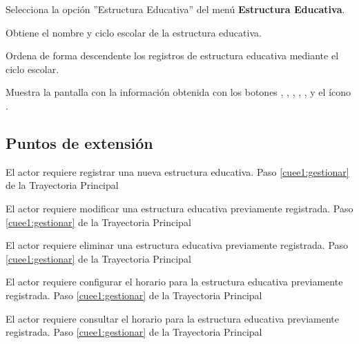 \begin{UCtrayectoria}
	
	\UCpaso [\UCactor] Selecciona la opción ''Estructura Educativa'' del menú \textbf{Estructura Educativa}.
	
	\UCpaso [\UCsist] Obtiene el nombre y ciclo escolar de la estructura educativa.
	
	\UCpaso [\UCsist] Ordena de forma descendente los registros de estructura educativa mediante el ciclo escolar.
	
	\UCpaso[\UCsist] Muestra la pantalla  con la información obtenida con los botones , ,  , , ,  y el ícono \btnRegistrar. \label{cuee1:gestionar}
\end{UCtrayectoria}

\subsection{Puntos de extensión}

\UCExtensionPoint 
{El actor requiere registrar una nueva estructura educativa.}
{Paso \ref{cuee1:gestionar} de la Trayectoria Principal}
{}

\UCExtensionPoint 
{El actor requiere modificar una estructura educativa previamente registrada.}
{Paso \ref{cuee1:gestionar} de la Trayectoria Principal}
{}

\UCExtensionPoint 
{El actor requiere eliminar una estructura educativa previamente registrada.}
{Paso \ref{cuee1:gestionar} de la Trayectoria Principal}
{}

\UCExtensionPoint 
{El actor requiere configurar el horario para la estructura educativa previamente registrada.}
{Paso \ref{cuee1:gestionar} de la Trayectoria Principal}
{}

\UCExtensionPoint 
{El actor requiere consultar el horario para la estructura educativa previamente registrada.}
{Paso \ref{cuee1:gestionar} de la Trayectoria Principal}
{}

